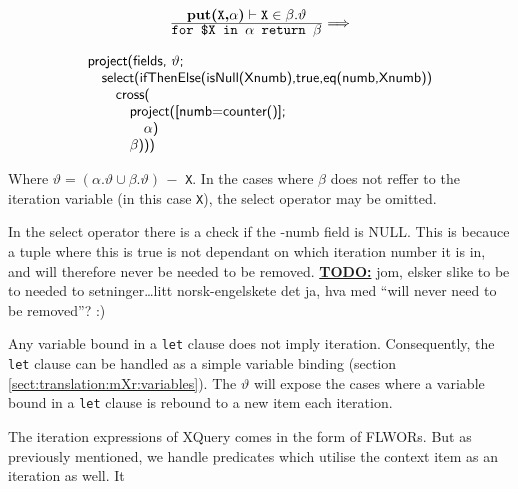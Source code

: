 \begin{equation}
\centering
\begin{array}{c}
	\frac{\displaystyle \textbf{put(}\texttt{X}\textbf{,}\alpha\textbf{)}\vdash\texttt{X}\in\beta . \vartheta}
	{\displaystyle \texttt{for \$X in }\alpha	\texttt{ return }\beta}
	
	\Longrightarrow 
	\\
	\mbox{} \\
	
	\begin{array}{l}
	\mbox{\textsf{project(fields, }} \vartheta \mbox{\textsf{;}} \\ \quad
	\mbox{\textsf{select(ifThenElse(isNull(Xnumb),true,eq(numb,Xnumb))}} \\ \quad \quad 
	\mbox{\textsf{cross(}} \\ \quad \quad \quad
	\mbox{\textsf{project([numb=counter()];}} \\ \quad \quad \quad \quad
	\alpha \mbox{\textsf{)}} \\ \quad \quad \quad 
	\beta \mbox{\textsf{)))}}
	\end{array}
\end{array}
\label{eq:translation:simpleIteration}
\end{equation}

Where $\vartheta = (\alpha.\vartheta \cup \beta.\vartheta)\, -$ \texttt{X}. In the cases where $\beta$ does not
reffer to the iteration variable (in this case \texttt{X}), the \textsf{select} operator may be omitted.

In the \textsf{select} operator there is a check if the \textsf{-numb} field is \textsf{NULL}. This is becauce a
tuple where this is true is not dependant on which iteration number it is in, and will therefore never be needed
to be removed. \underline{\textbf{\Large TODO:}} jom, elsker slike to be to
needed to setninger\ldots litt norsk-engelskete det ja, hva med ``will never
need to be removed''? :)

Any variable bound in a \texttt{let} clause does not imply iteration. Consequently, the \texttt{let} clause can be
handled as a simple variable binding (section \ref{sect:translation:mXr:variables}). The $\vartheta$ will expose
the cases where a variable bound in a \texttt{let} clause is rebound to a new item each iteration.



The iteration expressions of XQuery comes in the form of FLWORs. But as
previously mentioned, we handle predicates which utilise the context item as an
iteration as well. It 

